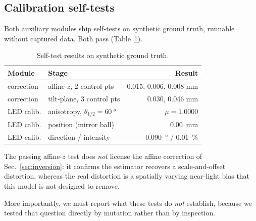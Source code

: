 \documentclass[journal,10pt]{IEEEtran}
\begin{document}
\subsection{Calibration self-tests}\label{sec:selftest}
Both auxiliary modules ship self-tests on synthetic ground truth, runnable
without captured data. Both pass (Table~\ref{tab:selftest}).

\begin{table}[t]
\centering
\caption{Self-test results on synthetic ground truth.}
\label{tab:selftest}
\footnotesize
\begin{tabular}{@{}llr@{}}
\toprule
\textbf{Module} & \textbf{Stage} & \textbf{Result} \\
\midrule
correction & affine-$z$, 2 control pts & 0.015, 0.006, 0.008 mm \\
correction & tilt-plane, 3 control pts & 0.030, 0.046 mm \\
LED calib. & anisotropy, $\theta_{1/2}=\SI{60}{\degree}$ & $\mu = 1.0000$ \\
LED calib. & position (mirror ball) & \SI{0.00}{\milli\metre} \\
LED calib. & direction / intensity & \SI{0.090}{\degree} / \SI{0.01}{\percent} \\
\bottomrule
\end{tabular}
\end{table}

The passing affine-$z$ test does \emph{not} license the affine correction of
Sec.~\ref{sec:inversion}: it confirms the estimator recovers a scale-and-offset
distortion, whereas the real distortion is a spatially varying near-light bias
that this model is not designed to remove.

More importantly, we must report what these tests do \emph{not} establish,
because we tested that question directly by mutation rather than by inspection.
\end{document}
